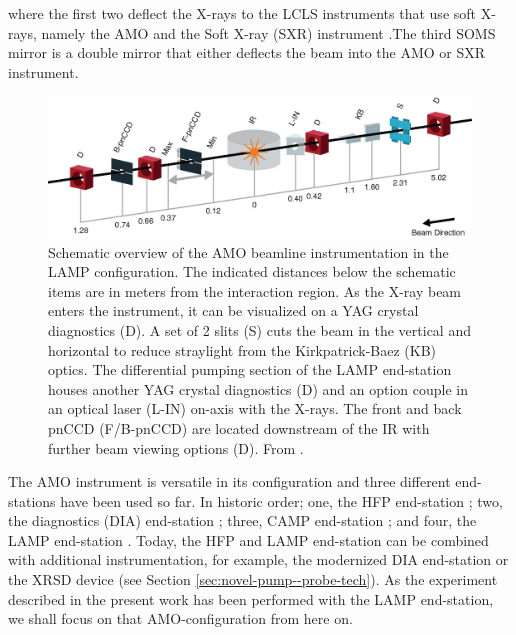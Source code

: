 where the first two deflect the X-rays to the LCLS instruments that use soft X-rays, namely the AMO and the Soft X-ray (SXR) instrument \citep{Schlotter-2012-RSI,Soufli-2012-AppOpt,Dakovski-2015-JSR}.The third SOMS mirror is a double mirror that either deflects the beam into the AMO or SXR instrument.
\begin{figure}
	\centering
		\includegraphics[width=1.00\textwidth]{images/beam_layout.eps}
	\caption[Schematic overview of the AMO beamline instrumentation.]{Schematic overview of the AMO beamline instrumentation in the LAMP configuration. The indicated distances below the schematic items are in meters from the interaction region. As the X-ray beam enters the instrument, it can be visualized on a YAG crystal diagnostics (D). A set of 2 slits (S) cuts the beam in the vertical and horizontal to reduce straylight from the Kirkpatrick-Baez (KB) optics. The differential pumping section of the LAMP end-station houses another YAG crystal diagnostics (D) and an option couple in an optical laser (L-IN) on-axis with the X-rays. The front and back pnCCD (F/B-pnCCD) are located downstream of the IR with further beam viewing options (D). From \citep{Ferguson-2015-JSR}.}
	\label{fig:beam_layout}
\end{figure}
The AMO instrument is versatile in its configuration and three different end-stations have been used so far. In historic order; one, the HFP end-station \citep{Bozek-2009-EPJST,Bostedt-2013-JPB}; two, the diagnostics (DIA) end-station \citep{Bostedt-2013-JPB}; three, CAMP end-station \citep{Strueder-2010-NIMPA}; and four, the LAMP end-station \citep{Ferguson-2015-JSR,Bucher-2016-Unpublished}. Today, the HFP and LAMP end-station can be combined with additional instrumentation, for example, the modernized DIA end-station or the XRSD device (see Section \ref{sec:novel-pump--probe-tech}). As the experiment described in the present work has been performed with the LAMP end-station, we shall focus on that AMO-configuration from here on.\\[1\baselineskip]
%
